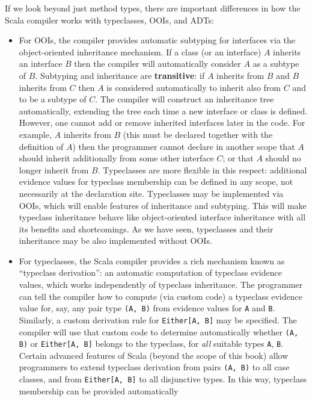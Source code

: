 If we look beyond just method types, there are important differences
in how the Scala compiler works with typeclasses, OOIs, and ADTs:
\begin{itemize}
\item For OOIs, the compiler provides automatic subtyping for interfaces
via the object-oriented inheritance mechanism. If a class (or an interface)
$A$ inherits an interface $B$ then the compiler will automatically
consider $A$ as a subtype of $B$. Subtyping and inheritance are
\textbf{transitive}: if $A$ inherits from $B$ and $B$ inherits
from $C$ then $A$ is considered automatically to inherit also from
$C$ and to be a subtype of $C$. The compiler will construct an inheritance
tree automatically, extending the tree each time a new interface or
class is defined. However, one cannot add or remove inherited interfaces
later in the code. For example, $A$ inherits from $B$ (this must
be declared together with the definition of $A$) then the programmer
cannot declare in another scope that $A$ should inherit additionally
from some other interface $C$; or that $A$ should no longer inherit
from $B$. Typeclasses are more flexible in this respect: additional
evidence values for typeclass membership can be defined in any scope,
not necessarily at the declaration site. Typeclasses may be implemented
via OOIs, which will enable features of inheritance and subtyping.
This will make typeclass inheritance behave like object-oriented interface
inheritance with all its benefits and shortcomings. As we have seen,
typeclasses and their inheritance may be also implemented without
OOIs.
\item For typeclasses, the Scala compiler provides a rich mechanism known
as \textsf{``}typeclass derivation\textsf{''}: an automatic computation of typeclass
evidence values, which works independently of typeclass inheritance.
The programmer can tell the compiler how to compute (via custom code)
a typeclass evidence value for, say, any pair type \lstinline!(A, B)!
from evidence values for \lstinline!A! and \lstinline!B!. Similarly,
a custom derivation rule for \lstinline!Either[A, B]! may be specified.
The compiler will use that custom code to determine automatically
whether \lstinline!(A, B)! or \lstinline!Either[A, B]! belongs to
the typeclass, for \emph{all} suitable types \lstinline!A!, \lstinline!B!.
Certain advanced features of Scala (beyond the scope of this book)
allow programmers to extend typeclass derivation from pairs \lstinline!(A, B)!
to all case classes, and from \lstinline!Either[A, B]! to all disjunctive
types. In this way, typeclass membership can be provided automatically

\end{itemize}
